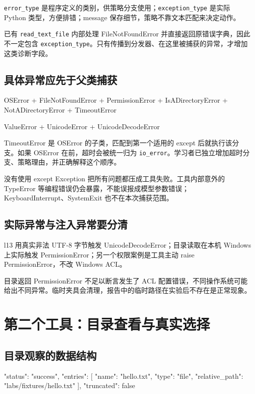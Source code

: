 \documentclass[UTF8,zihao=-4,fontset=fandol]{ctexart}
\begin{document}
\nolinkurl{error_type} 是程序定义的类别，供策略分支使用；\nolinkurl{exception_type} 是实际 Python 类型，方便排错；message 保存细节，策略不靠文本匹配来决定动作。

已有 \nolinkurl{read_text_file} 内部处理 FileNotFoundError 并直接返回原错误字典，因此不一定包含 \nolinkurl{exception_type}。只有传播到分发器、在这里被捕获的异常，才增加这类诊断字段。

\subsection{具体异常应先于父类捕获}

\begin{Code}
OSError
  + FileNotFoundError
  + PermissionError
  + IsADirectoryError
  + NotADirectoryError
  + TimeoutError

ValueError
  + UnicodeError
      + UnicodeDecodeError
\end{Code}

TimeoutError 是 OSError 的子类，匹配到第一个适用的 except 后就执行该分支。如果 OSError 在前，超时会被统一归为 \nolinkurl{io_error}。学习者已独立增加超时分支、策略理由，并正确解释这个顺序。

没有使用 except Exception 把所有问题都压成工具失败。工具内部意外的 TypeError 等编程错误仍会暴露，不能误报成模型参数错误；KeyboardInterrupt、SystemExit 也不在本次捕获范围。

\subsection{实际异常与注入异常要分清}

l13 用真实非法 UTF-8 字节触发 UnicodeDecodeError；目录读取在本机 Windows 上实际触发 PermissionError；另一个权限案例是工具主动 raise PermissionError，不改 Windows ACL。

目录返回 PermissionError 不足以断言发生了 ACL 配置错误，不同操作系统可能给出不同异常。临时夹具会清理，报告中的临时路径在实验后不存在是正常现象。

\section{第二个工具：目录查看与真实选择}

\subsection{目录观察的数据结构}

\begin{Code}
{
  "status": "success",
  "entries": [{
    "name": "hello.txt",
    "type": "file",
    "relative_path": "labs/fixtures/hello.txt"
  }],
  "truncated": false
}
\end{Code}
\end{document}
